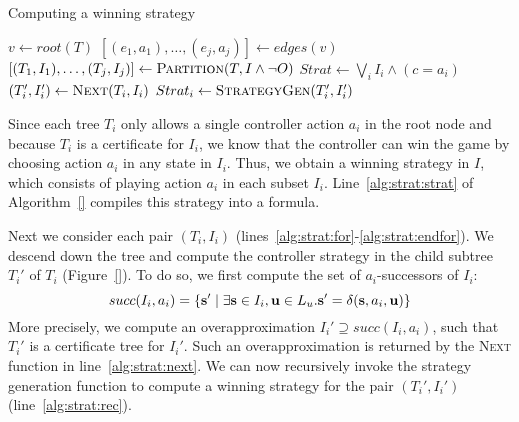 \begin{algorithm}[t]
   \caption{Computing a winning strategy}\label{alg:strat}
   \begin{algorithmic}[1]
            \State $v \gets root(T)$
            \State $[(e_1, a_1),\ldots,(e_j,a_j)] \gets edges(v)$
            \State $[(T_1,I_1),\ldots,(T_j, I_j)] \gets \textsc{Partition}(T, I \land \neg O)$
            \State $Strat \gets \bigvee_i I_i \land (c = a_i)$\label{alg:strat:strat}
            \label{alg:strat:for}
                \State $(T_i', I_i') \gets \textsc{Next}(T_i, I_i)$\label{alg:strat:next}
                \State $Strat_i \gets \textsc{StrategyGen}(T_i', I_i')$\label{alg:strat:rec}
            \EndFor\label{alg:strat:endfor}
            \State {} \label{alg:strat:return}
        \EndFunction
    \end{algorithmic}
\end{algorithm}


Since each tree $T_i$ only allows a single controller action $a_i$
in the root node and because $T_i$ is a certificate for $I_i$, we
know that the controller can win the game by choosing action $a_i$
in any state in $I_i$.  Thus, we obtain a winning strategy in $I$,
which consists of playing action $a_i$ in each subset $I_i$.  Line~\ref{alg:strat:strat}
of Algorithm~\ref{} compiles this strategy into a formula.

Next we consider each pair $(T_i, I_i)$
(lines~\ref{alg:strat:for}-\ref{alg:strat:endfor}). We descend
down the tree and compute the controller strategy in the child
subtree $T_i'$ of $T_i$ (Figure~\ref{}).  To do so, we first
compute the set of $a_i$-successors of $I_i$:
\begin{equation}\label{eq:succ}
    succ(I_i, a_i) = \{\mathbf{s}' \mid \exists \mathbf{s}\in I_i,\mathbf{u}\in L_u. \mathbf{s}' = \delta(\mathbf{s}, a_i, \mathbf{u})\}
\end{equation}
More precisely, we compute an overapproximation
$I_i'\supseteq succ(I_i, a_i)$, such that $T_i'$ is a certificate
tree for $I_i'$.  Such an overapproximation is returned by the
\textsc{Next} function in line~\ref{alg:strat:next}.  We can now
recursively invoke the strategy generation function to compute a
winning strategy for the pair $(T_i', I_i')$
(line~\ref{alg:strat:rec}).

